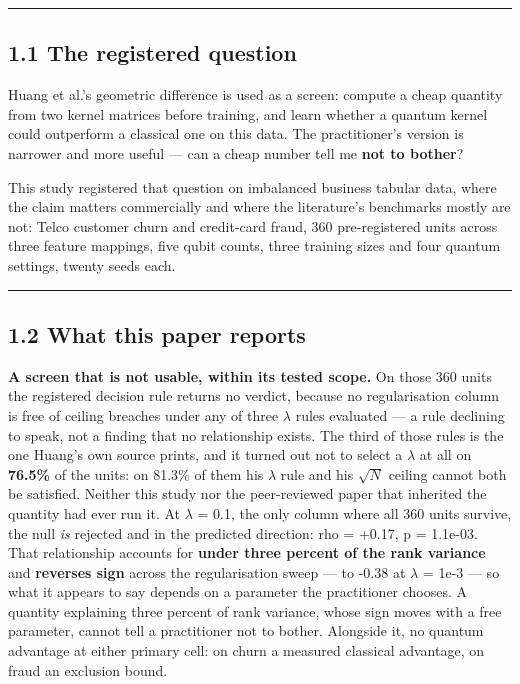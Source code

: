 \documentclass[
  10pt,
]{article}
\begin{document}
\begin{center}\rule{0.5\linewidth}{0.5pt}\end{center}

\subsection{1.1 The registered question}\label{the-registered-question}

Huang et al.'s geometric difference is used as a screen: compute a cheap
quantity from two kernel matrices before training, and learn whether a
quantum kernel could outperform a classical one on this data. The
practitioner's version is narrower and more useful --- can a cheap
number tell me \textbf{not to bother}?

This study registered that question on imbalanced business tabular data,
where the claim matters commercially and where the literature's
benchmarks mostly are not: Telco customer churn and credit-card fraud,
360 pre-registered units across three feature mappings, five qubit
counts, three training sizes and four quantum settings, twenty seeds
each.

\begin{center}\rule{0.5\linewidth}{0.5pt}\end{center}

\subsection{1.2 What this paper reports}\label{what-this-paper-reports}

\textbf{A screen that is not usable, within its tested scope.} On those
360 units the registered decision rule returns no verdict, because no
regularisation column is free of ceiling breaches under any of three
\(\lambda\) rules evaluated --- a rule declining to speak, not a finding
that no relationship exists. The third of those rules is the one Huang's
own source prints, and it turned out not to select a \(\lambda\) at all
on \textbf{76.5\%} of the units: on 81.3\% of them his \(\lambda\) rule
and his \(\sqrt{N}\) ceiling cannot both be satisfied. Neither this
study nor the peer-reviewed paper that inherited the quantity had ever
run it. At \(\lambda\) = 0.1, the only column where all 360 units
survive, the null \emph{is} rejected and in the predicted direction: rho
= +0.17, p = 1.1e-03. That relationship accounts for \textbf{under three
percent of the rank variance} and \textbf{reverses sign} across the
regularisation sweep --- to -0.38 at \(\lambda\) = 1e-3 --- so what it
appears to say depends on a parameter the practitioner chooses. A
quantity explaining three percent of rank variance, whose sign moves
with a free parameter, cannot tell a practitioner not to bother.
Alongside it, no quantum advantage at either primary cell: on churn a
measured classical advantage, on fraud an exclusion bound.
\end{document}
